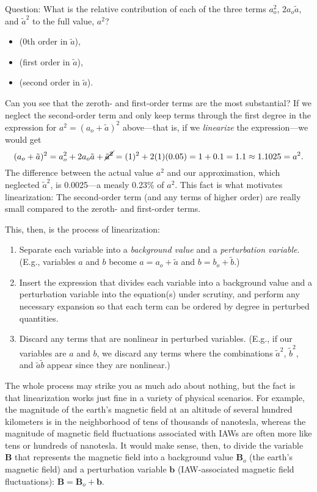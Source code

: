 Question: What is the relative contribution of each of the three terms $a_o^2$,
$2 a_o \tilde a$, and $\tilde a^2$ to the full value, $a^2$?
\begin{itemize}
\item {} (0th order in $\tilde a$),
\item {} (first order in $\tilde a$),
\item {} (second order in $\tilde a$).
\end{itemize}

Can you see that the zeroth- and first-order terms are the most substantial? If
we neglect the second-order term and only keep terms through the first degree in
the expression for $a^2 = (a_o + \tilde a)^2$ above---that is, if we
\emph{linearize} the expression---we would get
\begin{equation*}
  (a_o + \tilde a)^2 = a_o^2 + 2 a_o \tilde a + \cancel{{\tilde a}^2} = (1)^2 + 2(1)(0.05) = 1 + 0.1 = 1.1 \approx 1.1025 = a^2.
\end{equation*}
The difference between the actual value $a^2$ and our approximation, which
neglected $\tilde a^2$, is 0.0025---a measly 0.23\% of $a^2$. This fact is what
motivates linearization: The second-order term (and any terms of higher order)
are really small compared to the zeroth- and first-order terms.

This, then, is the process of linearization: 
\begin{enumerate}
\item Separate each variable into a \emph{background value} and a
  \emph{perturbation variable}. (E.g., variables $a$ and $b$ become
  $a = a_o + \tilde a$ and $b = b_o + \tilde b$.)
\item Insert the expression that divides each variable into a background value
  and a perturbation variable into the equation(s) under scrutiny, and perform
  any necessary expansion so that each term can be ordered by degree in
  perturbed quantities.
\item Discard any terms that are nonlinear in perturbed variables. (E.g., if our
  variables are $a$ and $b$, we discard any terms where the combinations
  $\tilde a^2$, $\tilde b^2$, and $\tilde a \tilde b$ appear since they are nonlinear.)
\end{enumerate}

The whole process may strike you as much ado about nothing, but the fact is that
linearization works just fine in a variety of physical scenarios. For example,
the magnitude of the earth's magnetic field at an altitude of several hundred
kilometers is in the neighborhood of tens of thousands of nanotesla, whereas the
magnitude of magnetic field fluctuations associated with IAWs are often more
like tens or hundreds of nanotesla. It would make sense, then, to divide the
variable $\mathbf{B}$ that represents the magnetic field into a background value
$\mathbf{B}_o$ (the earth's magnetic field) and a perturbation variable
$\mathbf{b}$ (IAW-associated magnetic field fluctuations):
$\mathbf{B} = \mathbf{B}_o + \mathbf{b}$.

